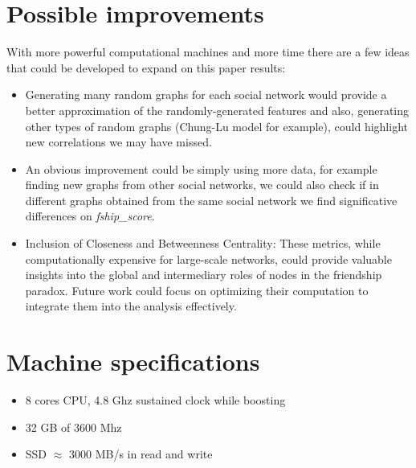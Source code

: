 \documentclass{article}
\begin{document}
\section{Possible improvements}
With more powerful computational machines and more time there are a few ideas that could be developed to expand on this paper results:
\begin{itemize}
    \item Generating many random graphs for each social network would provide a better approximation of the randomly-generated features and also, generating other types of random graphs (Chung-Lu model for example), could highlight new correlations we may have missed.
    \item An obvious improvement could be simply using more data, for example finding new graphs from other social networks, we could also check if in different graphs obtained from the same social network we find significative differences on \textit{fship\_score}.
    \item Inclusion of Closeness and Betweenness Centrality: These metrics, while computationally expensive for large-scale networks, could provide valuable insights into the global and intermediary roles of nodes in the friendship paradox. Future work could focus on optimizing their computation to integrate them into the analysis effectively.
\end{itemize}

\section{Machine specifications}
\begin{itemize}
    \item 8 cores CPU, 4.8 Ghz sustained clock while boosting
    \item 32 GB of 3600 Mhz 
    \item SSD $\approx$ 3000 MB/s in read and write
\end{itemize}
\end{document}
